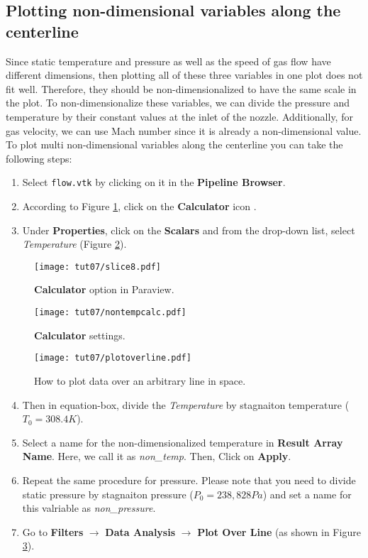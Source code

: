\subsection{Plotting non-dimensional variables along the centerline}
Since static temperature and pressure as well as the speed of gas flow have different dimensions, then plotting all of these three variables in one plot does not fit well. Therefore, they should be non-dimensionalized to have the same scale in the plot. To non-dimensionalize these variables, we can divide the pressure and temperature by their constant values at the inlet of the nozzle. Additionally, for gas velocity, we can use Mach number since it is already a non-dimensional value. To plot multi non-dimensional variables along the centerline you can take the following steps:
\begin{enumerate}[label=\arabic*)]
	\setcounter{enumi}{0}
	\item Select \texttt{flow.vtk} by clicking on it in the \textbf{Pipeline Browser}.
	\item According to Figure \ref{fig7:calculator}, click on the \textbf{Calculator} icon .
	\item Under \textbf{Properties}, click on the \textbf{Scalars} and from the drop-down list, select \textit{Temperature} (Figure \ref{fig7:calculator2}).	
\end{enumerate}
\begin{figure}[ht]
	\centering
	\texttt{[image: tut07/slice8.pdf]}
	\caption{\textbf{Calculator} option in Paraview.}
	\label{fig7:calculator}
\end{figure}
\begin{figure}[ht]
	\centering
	\texttt{[image: tut07/nontempcalc.pdf]}
	\caption{\textbf{Calculator} settings.}
	\label{fig7:calculator2}
\end{figure}
\begin{figure}[H]
	\centering
	\texttt{[image: tut07/plotoverline.pdf]}
	\caption{How to plot data over an arbitrary line in space.}
	\label{fig7:plot_over_line}
\end{figure}
\begin{enumerate}[label=\arabic*)]
	\setcounter{enumi}{3}
	\item Then in equation-box, divide the \textit{Temperature} by stagnaiton temperature ($T_{0}=308.4 K$).
	\item Select a name for the non-dimensionalized temperature in \textbf{Result Array Name}. Here, we call it as \textit{non\_temp}. Then, Click on \textbf{Apply}.
	\item Repeat the same procedure for pressure. Please note that you need to divide static pressure by stagnaiton pressure ($P_{0}=238,828 Pa$) and set a name for this valriable as \textit{non\_pressure}.
	\item Go to \textbf{Filters} $\rightarrow$  \textbf{Data Analysis} $\rightarrow$  \textbf{Plot Over Line} (as shown in Figure \ref{fig7:plot_over_line}).
\end{enumerate}
